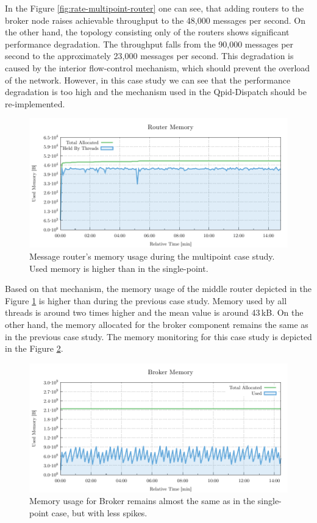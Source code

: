 In the Figure \ref{fig:rate-multipoint-router} one can see, that adding routers to the broker node raises achievable throughput to the 48,000 messages per second. On the other hand, the topology consisting only of the routers shows significant performance degradation. The throughput falls from the 90,000 messages per second to the approximately 23,000 messages per second. This degradation is caused by the interior flow-control mechanism, which should prevent the overload of the network. However, in this case study we can see that the performance degradation is too high and the mechanism used in the Qpid-Dispatch should be re-implemented.


\begin{figure}[H]
	\centering
	\includegraphics[width=1\linewidth]{obrazky-figures/charts/multipoint-router-only-throughput-memory.pdf}
	\caption{Message router's memory usage during the multipoint case study. Used memory is higher than in the single-point.}
	\label{fig:router-multipoint-memory}
\end{figure}

Based on that mechanism, the memory usage of the middle router depicted in the Figure \ref{fig:router-multipoint-memory} is higher than during the previous case study. Memory used by all threads is around two times higher and the mean value is around 43\,kB. On the other hand, the memory allocated for the broker component remains the same as in the previous case study. The memory monitoring for this case study is depicted in the Figure \ref{fig:broker-multipoint-memory}.

\begin{figure}[H]
	\centering
	\includegraphics[width=1\linewidth]{obrazky-figures/charts/multipoint-router-broker-throughput-memory.pdf}
	\caption{Memory usage for Broker remains almost the same as in the single-point case, but with less spikes.}
	\label{fig:broker-multipoint-memory}
\end{figure}


